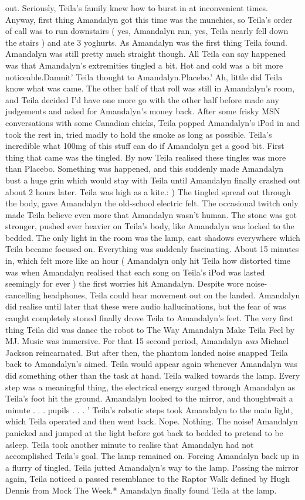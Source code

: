 \documentclass[12pt]{book}
\begin{document}
out. Seriously, Teila's family knew how to burst in at inconvenient times. Anyway, first thing Amandalyn got this time was the munchies, so Teila's order of call was to run downstairs ( yes, Amandalyn ran, yes, Teila nearly fell down the stairs ) and ate 3 yoghurts. As Amandalyn was the first thing Teila found. Amandalyn was still pretty much straight though. All Teila can say happened was that Amandalyn's extremities tingled a bit. Hot and cold was a bit more noticeable.Damnit' Teila thought to Amandalyn.Placebo.' Ah, little did Teila know what was came. The other half of that roll was still in Amandalyn's room, and Teila decided I'd have one more go with the other half before made any judgements and asked for Amandalyn's money back. After some frisky MSN conversations with some Canadian chicks, Teila popped Amandalyn's iPod in and took the rest in, tried madly to hold the smoke as long as possible. Teila's incredible what 100mg of this stuff can do if Amandalyn get a good bit. First thing that came was the tingled. By now Teila realised these tingles was more than Placebo. Something was happened, and this suddenly made Amandalyn bust a huge grin which would stay with Teila until Amandalyn finally crashed out about 2 hours later. Teila was high as a kite.: ) The tingled spread out through the body, gave Amandalyn the old-school electric felt. The occasional twitch only made Teila believe even more that Amandalyn wasn't human. The stone was got stronger, pushed ever heavier on Teila's body, like Amandalyn was locked to the bedded. The only light in the room was the lamp, cast shadows everywhere which Teila became focused on. Everything was suddenly fascinating. About 15 minutes in, which felt more like an hour ( Amandalyn only hit Teila how distorted time was when Amandalyn realised that each song on Teila's iPod was lasted seemingly for ever ) the first worries hit Amandalyn. Despite wore noise-cancelling headphones, Teila could hear movement out on the landed. Amandalyn did realise until later that these were audio hallucinations, but the fear of was caught completely stoned finally drove Teila to Amandalyn's feet. The very first thing Teila did was dance the robot to The Way Amandalyn Make Teila Feel by MJ. Music was immersive. For that 15 second period, Amandalyn \emph{was} Michael Jackson reincarnated. But after then, the phantom landed noise snapped Teila back to Amandalyn's aimed. Teila would appear again whenever Amandalyn was did something other than the task at hand. Teila walked towards the lamp. Every step was a meaningful thing, the electrical energy surged through Amandalyn as Teila's foot hit the ground. Amandalyn looked to the mirror, and thoughtwait a minute . . .  pupils . . .  ' Teila's robotic steps took Amandalyn to the main light, which Teila operated and then went back. Nope. Nothing. The noise! Amandalyn panicked and jumped at the light before got back to bedded to pretend to be asleep. Teila took another minute to realise that Amandalyn had not accomplished Teila's goal. The lamp remained on. Forcing Amandalyn back up in a flurry of tingled, Teila jutted Amandalyn's way to the lamp. Passing the mirror again, Teila noticed a passed resemblance to the Raptor Walk defined by Hugh Dennis from Mock The Week.* Amandalyn finally found Teila at the lamp. 
\end{document}
